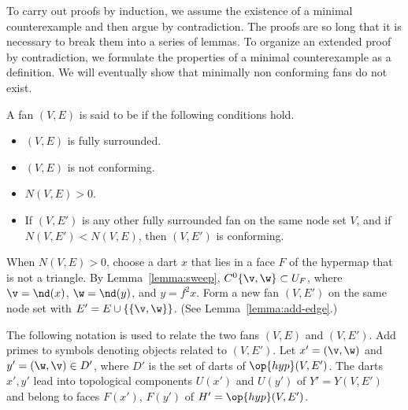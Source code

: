 To carry out proofs by induction, we assume the existence of a minimal
counterexample and then argue by contradiction.  The proofs are so
long that it is necessary to break them into a series of lemmas.  To
organize an extended proof by contradiction, we formulate the
properties of a minimal counterexample as a definition.  We will eventually
show that minimally non conforming fans do not exist.

\begin{definition}
A fan $(V,E)$ is said to be  if
the following conditions hold.
\begin{itemize}
\item $(V,E)$ is fully surrounded.
\item $(V,E)$ is not conforming.
\item $N(V,E)>0$.
\item If $(V,E')$ is any other fully surrounded fan on the same node
set $V$, and if $N(V,E') < N(V,E)$, then $(V,E')$ is conforming.
\end{itemize}
\end{definition}
%



\begin{remark}\label{remark:reduction}
  When $N(V,E)>0$, choose a dart $x$ that lies in a face $F$ of the
  hypermap that is not a triangle.  By Lemma~\ref{lemma:sweep},
  $C^0\{\v,\w\}\subset U_F$, where $\v=\nd(x)$, $\w=\nd(y)$, and
  $y=f^2 x$.  Form a new fan $(V,E')$ on the same node set with $E' =
  E\cup \{\{\v,\w\}\}$.  (See Lemma~\ref{lemma:add-edge}.)

The following notation is used to relate the two fans $(V,E)$ and $(V,E')$.  
Add primes to symbols
denoting objects related to $(V,E')$.
Let $x'=(\v,\w)$ and $y'=(\w,\v)\in D'$, where $D'$ is the set of darts of $\op{hyp}(V,E')$.
The darts $x',y'$ lead into topological components
$U(x')$ and $U(y')$ of $Y'=Y(V,E')$ and belong to faces $F(x')$,
$F(y')$ of $H'=\op{hyp}(V,E')$.
\end{remark}

